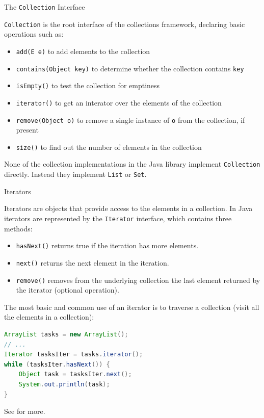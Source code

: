 \documentclass{beamer}
\begin{document}
\begin{frame}[fragile]{The {\tt Collection} Interface}


{\tt Collection} is the root interface of the collections framework, declaring basic operations such as:
\begin{itemize}
\item {\tt add(E e)} to add elements to the collection
\item {\tt contains(Object key)} to determine whether the collection contains {\tt key}
\item {\tt isEmpty()} to test the collection for emptiness
\item {\tt iterator()} to get an interator over the elements of the collection
\item {\tt remove(Object o)} to remove a single instance of {\tt o} from the collection, if present
\item {\tt size()} to find out the number of elements in the collection
\end{itemize}
None of the collection implementations in the Java library implement {\tt Collection} directly.  Instead they implement {\tt List} or {\tt Set}.

\end{frame}


\begin{frame}[fragile]{Iterators}


Iterators are objects that provide access to the elements in a collection.  In Java iterators are represented by the {\tt Iterator} interface, which contains three methods:
\begin{itemize}
\item {\tt hasNext()} returns true if the iteration has more elements.
\item {\tt next()} returns the next element in the iteration.
\item {\tt remove()} removes from the underlying collection the last element returned by the iterator (optional operation).
\end{itemize}

The most basic and common use of an iterator is to traverse a collection (visit all the elements in a collection):
\begin{lstlisting}[language=Java]
ArrayList tasks = new ArrayList();
// ...
Iterator tasksIter = tasks.iterator();
while (tasksIter.hasNext()) {
    Object task = tasksIter.next();
    System.out.println(task);
}
\end{lstlisting}
See  for more.

\end{frame}
\end{document}
